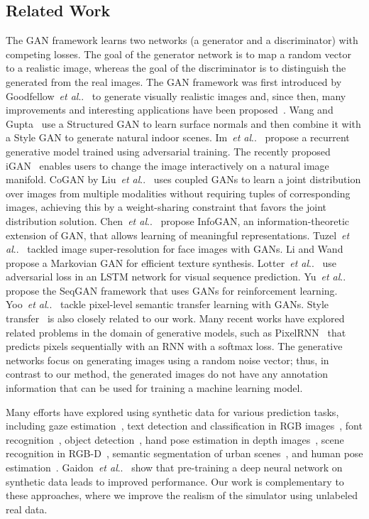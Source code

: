 \documentclass[10pt,twocolumn,letterpaper]{article}
\makeatletter
\DeclareRobustCommand\onedot{\futurelet\@let@token\@onedot}
\def\@onedot{\ifx\@let@token.\else.\null\fi\xspace}
\def\etal{\emph{et al}\onedot}
\makeatother
\begin{document}
\subsection{Related Work}
The GAN framework learns two networks (a generator and a discriminator) with competing losses. 
The goal of the generator network is to map a random vector to a realistic image, whereas the goal of the discriminator is to distinguish the generated from the real images.
The GAN framework was first introduced by Goodfellow~\etal~\cite{Goodfellow14} to generate visually realistic images and, since then, many improvements and interesting applications have been proposed~\cite{Salimans16}.
Wang and Gupta~\cite{Wang2016} use a Structured GAN to learn surface normals and then combine it with a Style GAN to generate natural indoor scenes. 
Im~\etal~\cite{Im2015} propose a recurrent generative model trained using adversarial training. 
The recently proposed iGAN~\cite{zhu2016generative} enables users to change the image interactively on a natural image manifold.  
CoGAN by Liu~\etal~\cite{liu2016coupled} uses coupled GANs to learn a joint distribution over images from multiple modalities without requiring tuples of corresponding images, achieving this by a weight-sharing constraint that favors the joint distribution solution.  
Chen~\etal~\cite{Chen16} propose InfoGAN, an information-theoretic extension of GAN, that allows learning of meaningful representations. 
Tuzel~\etal~\cite{Tuzel16} tackled image super-resolution for face images with GANs.  
Li and Wand~\cite{Li2016} propose a Markovian GAN for efficient texture synthesis. 
Lotter~\etal~\cite{Lotter15} use adversarial loss in an LSTM network for visual sequence prediction.
Yu~\etal~\cite{SeqGan_Yu16} propose the SeqGAN framework that uses GANs for reinforcement learning. 
Yoo~\etal~\cite{Yoo16} tackle pixel-level semantic transfer learning with GANs.
Style transfer~\cite{Gatys16} is also closely related to our work.
Many recent works have explored related problems in the domain of generative models, such as PixelRNN~\cite{vandenOord16} that predicts pixels sequentially with an RNN with a softmax loss.
The generative networks focus on generating images using a random noise vector; thus, in contrast to our method, the generated images do not have any annotation information that can be used for training a machine learning model.

Many efforts have explored using synthetic data for various prediction tasks, including gaze estimation~\cite{Wood16}, text detection and classification in RGB images~\cite{Gupta16,Jaderberg16}, font recognition~\cite{Wang15}, object detection~\cite{Gupta14,Peng15}, hand pose estimation in depth images~\cite{tompson14NYU, Supancic15}, scene recognition in RGB-D~\cite{Handa16}, semantic segmentation of urban scenes~\cite{Ros_2016_CVPR}, and human pose estimation~\cite{Park15,Darrell15,LeCun04a,Ionescu14,Pishchulin12,Rogez16}. 
Gaidon~\etal~\cite{Gaidon16} show that pre-training a deep neural network on synthetic data leads to improved performance.
Our work is complementary to these approaches, where we improve the realism of the simulator using unlabeled real data.
\end{document}
